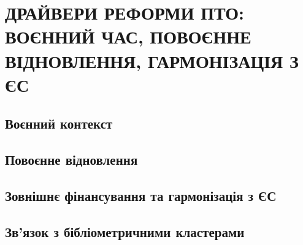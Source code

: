 
\section{\MakeUppercase{Драйвери реформи ПТО: воєнний час, повоєнне відновлення, гармонізація з ЄС}}
\label{sec:war-recovery}

\subsection{Воєнний контекст}
\label{sec:war-recovery-war}


\subsection{Повоєнне відновлення}
\label{sec:war-recovery-rebuilding}


\subsection{Зовнішнє фінансування та гармонізація з ЄС}
\label{sec:war-recovery-eu}


\subsection{Зв'язок з бібліометричними кластерами}
\label{sec:war-recovery-clusters}

